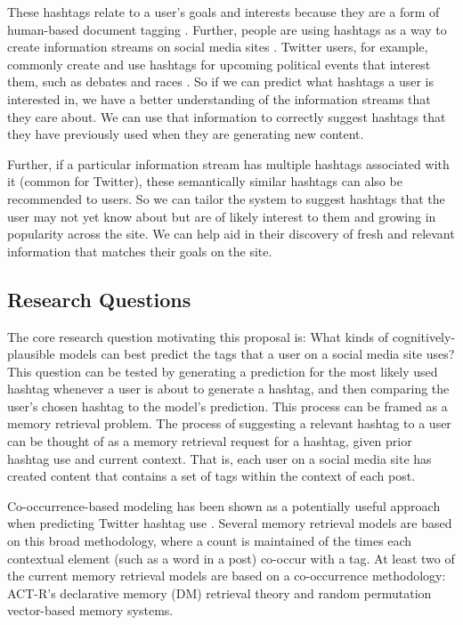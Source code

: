 \documentclass[man,floatsintext,donotrepeattitle]{apa6}
\begin{document}
These hashtags relate to a user's goals and interests because they are a form of human-based document tagging \parencite{Chang2010}.
Further, people are using hashtags as a way to create information streams on social media sites \parencite{Kwak2010}.
Twitter users, for example, commonly create and use hashtags for upcoming political events that interest them, such as debates and races \parencite{Diakopoulos2010}.
So if we can predict what hashtags a user is interested in, we have a better understanding of the information streams that they care about.
We can use that information to correctly suggest hashtags that they have previously used when they are generating new content.

Further, if a particular information stream has multiple hashtags associated with it (common for Twitter), these semantically similar hashtags can also be recommended to users.
So we can tailor the system to suggest hashtags that the user may not yet know about but are of likely interest to them and growing in popularity across the site.
We can help aid in their discovery of fresh and relevant information that matches their goals on the site.

\subsection{Research Questions}

The core research question motivating this proposal is:
What kinds of cognitively-plausible models can best predict the tags that a user on a social media site uses?
This question can be tested by generating a prediction for the most likely used hashtag whenever a user is about to generate a hashtag, and then comparing the user's chosen hashtag to the model's prediction.
This process can be framed as a memory retrieval problem.
The process of suggesting a relevant hashtag to a user can be thought of as a memory retrieval request for a hashtag, given prior hashtag use and current context.
That is, each user on a social media site has created content that contains a set of tags within the context of each post.

Co-occurrence-based modeling has been shown as a potentially useful approach when predicting Twitter hashtag use \parencite{Efron2010}.
Several memory retrieval models are based on this broad methodology, where a count is maintained of the times each contextual element (such as a word in a post) co-occur with a tag.
At least two of the current memory retrieval models are based on a co-occurrence methodology:
ACT-R's declarative memory (DM) retrieval theory and random permutation vector-based memory systems.
\end{document}
